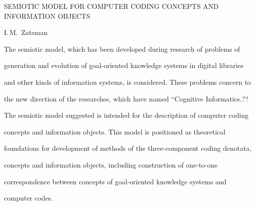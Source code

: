 


SEMIOTIC MODEL FOR COMPUTER CODING CONCEPTS AND INFORMATION OBJECTS 


I.\,M.~Zatsman


The semiotic model, which has been developed during research of problems of 


generation and evolution of goal-oriented knowledge systems in digital libraries 


and other kinds of information systems, is considered. These problems concern to 


the new direction of the researches, which have named ``Cognitive Informatics.?? 


The semiotic model suggested is intended for the description of computer coding 


concepts and information objects. This model is positioned as theoretical 


foundations for development of methods of the three-component coding denotata, 


concepts and information objects, including construction of one-to-one 


correspondence between concepts of goal-oriented knowledge systems and 


computer codes.


 


